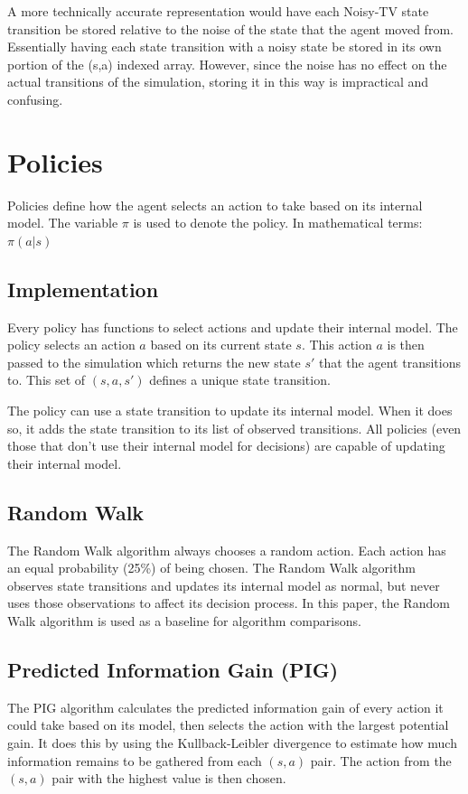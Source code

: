 \documentclass[12pt]{thesis}
\begin{document}
A more technically accurate representation would have each Noisy-TV state transition be stored relative to the noise of the state that the agent moved from. Essentially having each state transition with a noisy state be stored in its own portion of the (s,a) indexed array. However, since the noise has no effect on the actual transitions of the simulation, storing it in this way is impractical and confusing.

\section{Policies}
Policies define how the agent selects an action to take based on its internal model. The variable $\pi$ is used to denote the policy. In mathematical terms: $\pi(a | s)$
\subsection{Implementation}
Every policy has functions to select actions and update their internal model. The policy selects an action $a$ based on its current state $s$. This action $a$ is then passed to the simulation which returns the new state $s'$ that the agent transitions to. This set of $(s,a,s')$ defines a unique state transition.

The policy can use a state transition to update its internal model. When it does so, it adds the state transition to its list of observed transitions. All policies (even those that don't use their internal model for decisions) are capable of updating their internal model.
\subsection{Random Walk}
The Random Walk algorithm always chooses a random action. Each action has an equal probability (25\%) of being chosen. The Random Walk algorithm observes state transitions and updates its internal model as normal, but never uses those observations to affect its decision process. In this paper, the Random Walk algorithm is used as a baseline for algorithm comparisons.

\subsection{Predicted Information Gain (PIG)}
The PIG algorithm calculates the predicted information gain of every action it could take based on its model, then selects the action with the largest potential gain. It does this by using the Kullback-Leibler divergence to estimate how much information remains to be gathered from each $(s,a)$ pair. The action from the $(s,a)$ pair with the highest value is then chosen.
\end{document}
